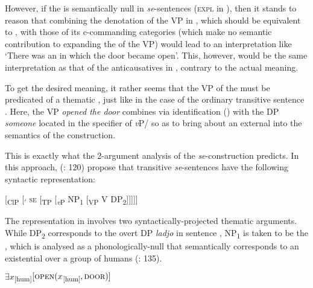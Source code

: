 \documentclass[output=paper,nonflat,newtxmath]{langsci/langscibook}
\begin{document}
 \noindent However, if the  is semantically null in  \textit{se}-sen\-ten\-ces (\textsc{expl} in ), then it stands to reason that combining the denotation of the VP in , which should be equivalent to , with those of its c-commanding categories (which make no semantic contribution to expanding the  of the VP) would lead to an interpretation like `There was an  in which the door became open'. This, however, would be the same interpretation as that of the anticausatives in , contrary to the actual meaning.

To get the desired meaning, it rather seems that the VP of the  must be predicated of a thematic , just like in the case of the ordinary transitive sentence . Here, the VP \textit{opened the door} combines via  identification (\citealt{kratzer1996}) with the  DP \textit{someone} located in the specifier of \textit{v}P/ so as to bring about an external  into the semantics of the construction.

This is exactly what the 2-argument analysis of the  \textit{se}-construction predicts. In this approach, \citeauthor{riverosheppard2003} (\citeyear{riverosheppard2003}: 120) propose that transitive  \textit{se}-sentences have the following syntactic representation:

\begin{exe}
\ex \label{ex:lenardic: 10} {[\textsubscript{ClP} [\textsubscript{$'$} \textsc{se} [\textsubscript{TP} [\textsubscript{\textit{v}P} NP\textsubscript{1} [\textsubscript{VP} V DP\textsubscript{2}]]]]]}
\end{exe}

\noindent The representation in  involves two syntactically-projected thematic arguments. While DP\textsubscript{2} corresponds to the overt  DP \textit{ladjo} in sentence , NP\textsubscript{1} is taken to be the , which is analysed as a phonologically-null  that semantically corresponds to an existential  over a group of humans (\citealt{riverosheppard2003}: 135).

\begin{exe}
\ex \label{ex:lenardic: 11} $\exists x$\textsubscript{[hum]}$[\textsc{open}(x$\textsubscript{[hum]}$, \textsc{door})]$
\end{exe}
\end{document}
